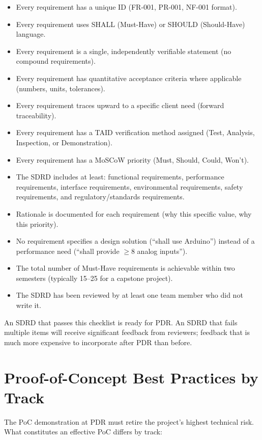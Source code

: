 \begin{itemize}[nosep,leftmargin=1.5em]
\item Every requirement has a unique ID (FR-001, PR-001, NF-001 format).
\item Every requirement uses SHALL (Must-Have) or SHOULD (Should-Have) language.
\item Every requirement is a single, independently verifiable statement (no compound requirements).
\item Every requirement has quantitative acceptance criteria where applicable (numbers, units, tolerances).
\item Every requirement traces upward to a specific client need (forward traceability).
\item Every requirement has a TAID verification method assigned (Test, Analysis, Inspection, or Demonstration).
\item Every requirement has a MoSCoW priority (Must, Should, Could, Won't).
\item The SDRD includes at least: functional requirements, performance requirements, interface requirements, environmental requirements, safety requirements, and regulatory/standards requirements.
\item Rationale is documented for each requirement (why this specific value, why this priority).
\item No requirement specifies a design solution (``shall use Arduino'') instead of a performance need (``shall provide $\geq$8 analog inputs'').
\item The total number of Must-Have requirements is achievable within two semesters (typically 15--25 for a capstone project).
\item The SDRD has been reviewed by at least one team member who did not write it.
\end{itemize}

An SDRD that passes this checklist is ready for PDR. An SDRD that fails multiple items will receive significant feedback from reviewers; feedback that is much more expensive to incorporate after PDR than before.



\section{Proof-of-Concept Best Practices by Track}
The PoC demonstration at PDR must retire the project's highest technical risk. What constitutes an effective PoC differs by track:

